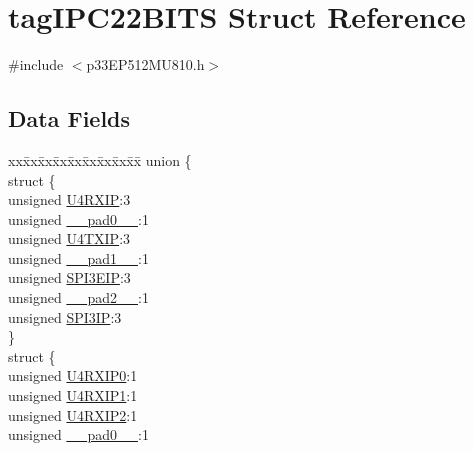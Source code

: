 \hypertarget{structtag_i_p_c22_b_i_t_s}{}\section{tag\+I\+P\+C22\+B\+I\+TS Struct Reference}
\label{structtag_i_p_c22_b_i_t_s}


{\ttfamily \#include $<$p33\+E\+P512\+M\+U810.\+h$>$}

\subsection*{Data Fields}
\begin{DoxyCompactItemize}
\item 
\begin{tabbing}
xx\=xx\=xx\=xx\=xx\=xx\=xx\=xx\=xx\=\kill
union \{\\
\>struct \{\\
\>\>unsigned \hyperlink{structtag_i_p_c22_b_i_t_s_abb2534c9cb5eadbbddd2be90801b9441}{U4RXIP}:3\\
\>\>unsigned \hyperlink{structtag_i_p_c22_b_i_t_s_adf71f3d8410c1f1dbbc96680a92c49af}{\_\_pad0\_\_}:1\\
\>\>unsigned \hyperlink{structtag_i_p_c22_b_i_t_s_a18997dd8424043d47d6cde01c6aa16e3}{U4TXIP}:3\\
\>\>unsigned \hyperlink{structtag_i_p_c22_b_i_t_s_acaf2d0924a107ec6e8d2e31febaf66f9}{\_\_pad1\_\_}:1\\
\>\>unsigned \hyperlink{structtag_i_p_c22_b_i_t_s_ad846a4e10fe378619dc037136f20bf1d}{SPI3EIP}:3\\
\>\>unsigned \hyperlink{structtag_i_p_c22_b_i_t_s_a4d97cc5f7d51d22fc2bf3eab35c9cb7f}{\_\_pad2\_\_}:1\\
\>\>unsigned \hyperlink{structtag_i_p_c22_b_i_t_s_a4d33e3fc4ca8daf898b700e1a5bdd302}{SPI3IP}:3\\
\>\} \\
\>struct \{\\
\>\>unsigned \hyperlink{structtag_i_p_c22_b_i_t_s_af9185cb3febe0b0f4318f5a9676acfc3}{U4RXIP0}:1\\
\>\>unsigned \hyperlink{structtag_i_p_c22_b_i_t_s_a6e3917b188fd2b25d24ceec0cb46977c}{U4RXIP1}:1\\
\>\>unsigned \hyperlink{structtag_i_p_c22_b_i_t_s_a54cb1c07fb602cc56f3c7ae8ca1b6cc4}{U4RXIP2}:1\\
\>\>unsigned \hyperlink{structtag_i_p_c22_b_i_t_s_adf71f3d8410c1f1dbbc96680a92c49af}{\_\_pad0\_\_}:1\\

\end{tabbing}
\end{DoxyCompactItemize}

